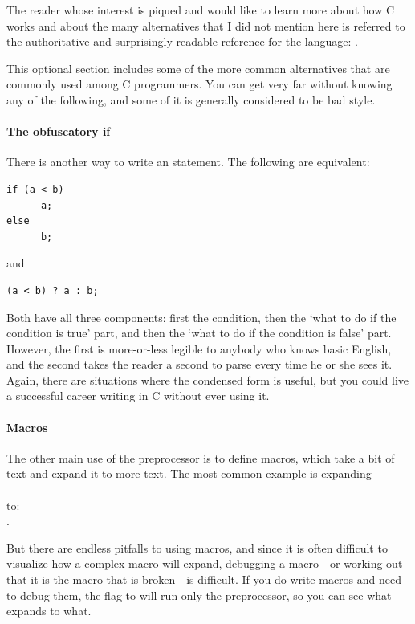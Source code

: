 \documentclass[12pt]{article}
\makeatletter
\def\ind#1{\index{#1}#1}
\def\cind#1{\index{#1@\cinline{#1}}\cinline{#1}}
\makeatother
\begin{document}
The reader whose interest is piqued and would like to learn more about
how C works and about the many alternatives that I did not mention here
is referred to the authoritative and surprisingly readable reference
for the language: \cite{kandr:c}.

This optional section includes some of the more common alternatives that
are commonly used among C programmers. You can get very far without
knowing any of the following, and some of it is generally considered to
be bad style.

\paragraph{The obfuscatory if} There is another way to write an \cind{if} statement. The following are equivalent:
\begin{lstlisting}
if (a < b)
      a;
else
      b;
\end{lstlisting}
and
\begin{lstlisting}
(a < b) ? a : b;
\end{lstlisting}
Both have all three components: first the condition, then the `what to do if the
condition is true' part, and then the `what to do if the condition is false'
part. However, the first is more-or-less legible to anybody who knows basic English,
and the second takes the reader a second to parse every time he or she
sees it. Again, there are situations where the condensed form is useful,
but you could live a successful career writing in C without ever using it.


\paragraph{Macros} \label{macros} 

The other main use of the preprocessor is to define macros, which take
a bit of text and expand it to more text. The most common example is
expanding\\
\\
to:\\
 .

But there are endless pitfalls to using macros, and since it is often
difficult to visualize how a complex macro will expand, debugging
a macro---or working out that it is the macro that is broken---is
difficult.  If you do write macros and need to debug them, the  flag to  will run only the \ind{preprocessor}, so you can
see what expands to what.
\end{document}
